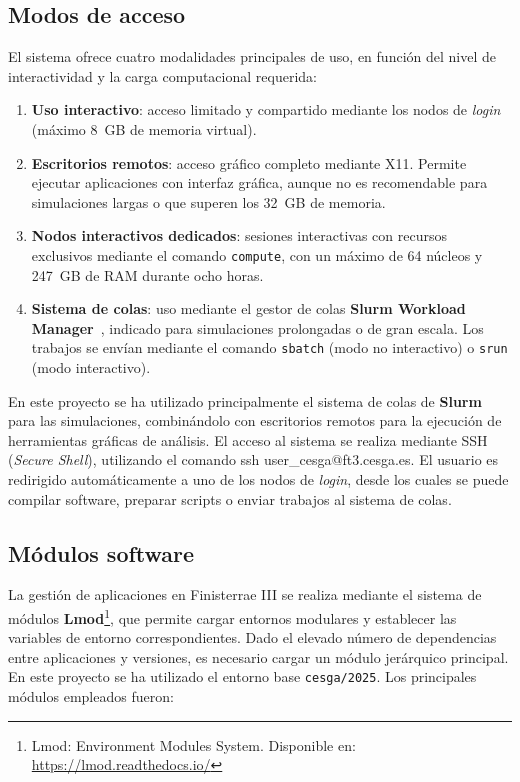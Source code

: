 \subsection{Modos de acceso}\label{subsec:modos-de-acceso}

El sistema ofrece cuatro modalidades principales de uso, en función del nivel de interactividad y la carga computacional requerida:

\begin{enumerate}
    \item \textbf{Uso interactivo}: acceso limitado y compartido mediante los nodos de \textit{login} (máximo 8~GB de memoria virtual).
    \item \textbf{Escritorios remotos}: acceso gráfico completo mediante X11. Permite ejecutar aplicaciones con interfaz gráfica, aunque no es recomendable para simulaciones largas o que superen los 32~GB de memoria.
    \item \textbf{Nodos interactivos dedicados}: sesiones interactivas con recursos exclusivos mediante el comando \texttt{compute}, con un máximo de 64 núcleos y 247~GB de RAM durante ocho horas.
    \item \textbf{Sistema de colas}: uso mediante el gestor de colas \textbf{Slurm Workload Manager}~\cite{slurm}, indicado para simulaciones prolongadas o de gran escala.
    Los trabajos se envían mediante el comando \texttt{sbatch} (modo no interactivo) o \texttt{srun} (modo interactivo).
\end{enumerate}

En este proyecto se ha utilizado principalmente el sistema de colas de \textbf{Slurm} para las simulaciones, combinándolo con escritorios remotos para la ejecución de herramientas gráficas de análisis.
El acceso al sistema se realiza mediante SSH (\textit{Secure Shell}), utilizando el comando ssh user\_cesga@ft3.cesga.es.
El usuario es redirigido automáticamente a uno de los nodos de \textit{login}, desde los cuales se puede compilar software, preparar scripts o enviar trabajos al sistema de colas.

\subsection{Módulos software}\label{subsec:modulos-software}
La gestión de aplicaciones en Finisterrae III se realiza mediante el sistema de módulos \textbf{Lmod}\footnote{Lmod: Environment Modules System. Disponible en: \url{https://lmod.readthedocs.io/}}, que permite cargar entornos modulares y establecer las variables de entorno correspondientes.
Dado el elevado número de dependencias entre aplicaciones y versiones, es necesario cargar un módulo jerárquico principal.
En este proyecto se ha utilizado el entorno base \texttt{cesga/2025}.
Los principales módulos empleados fueron:

